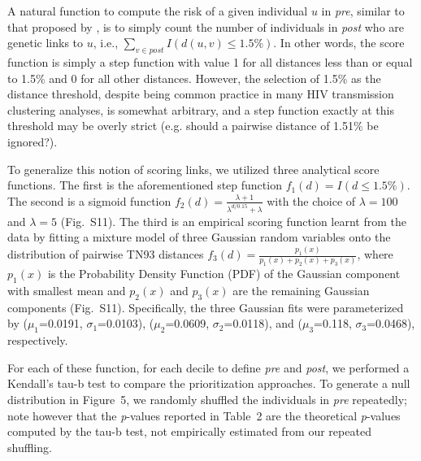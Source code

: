 \documentclass[a4paper,11pt]{article}
\newcommand{\authorcite}[1]{\citeauthor{#1}\supercite{#1}}
\begin{document}
A natural function to compute the risk of a given individual $u$ in \textit{pre},
similar to that proposed by \authorcite{Wertheim2018},
is to simply count the number of individuals in \textit{post} who are genetic links to $u$, i.e., $\sum_{v\in post}{I\left(d(u,v)\le1.5\%\right)}$.
In other words,
the score function is simply a step function with value 1 for all distances less than or equal to 1.5\% and 0 for all other distances.
However,
the selection of 1.5\% as the distance threshold,
despite being common practice in many HIV transmission clustering analyses,
is somewhat arbitrary,
and a step function exactly at this threshold may be overly strict
(e.g. should a pairwise distance of 1.51\% be ignored?).

To generalize this notion of scoring links,
we utilized three analytical score functions.
The first is the aforementioned step function $f_1(d)=I\left(d\le1.5\%\right)$.
The second is a sigmoid function $f_2(d)=\frac{\lambda+1}{\lambda^{d/0.15}+\lambda}$ with the choice of $\lambda=100$  and $\lambda=5$ (Fig.~S11).
The third is an empirical scoring function learnt from the data by fitting a mixture model of three Gaussian random variables onto the distribution of pairwise TN93 distances $f_3(d)=\frac{p_1(x)}{p_1(x)+p_2(x)+p_3(x)}$, where $p_1(x)$ is the Probability Density Function (PDF) of the Gaussian component with smallest mean and $p_2(x)$ and $p_3(x)$ are the remaining Gaussian components
(Fig.~S11).
Specifically, the three Gaussian fits were parameterized by ($\mu_1$=0.0191, $\sigma_1$=0.0103), ($\mu_2$=0.0609, $\sigma_2$=0.0118), and ($\mu_3$=0.118, $\sigma_3$=0.0468), respectively.

For each of these function,
for each decile to define \textit{pre} and \textit{post},
we performed a Kendall's tau-b test to compare the prioritization approaches.\supercite{Kendall1938}
To generate a null distribution in Figure~5, we randomly shuffled the individuals in \textit{pre} repeatedly; note however that the \textit{p}-values reported in Table~2 are the theoretical \textit{p}-values computed by the tau-b test, not empirically estimated from our repeated shuffling.

\end{document}
